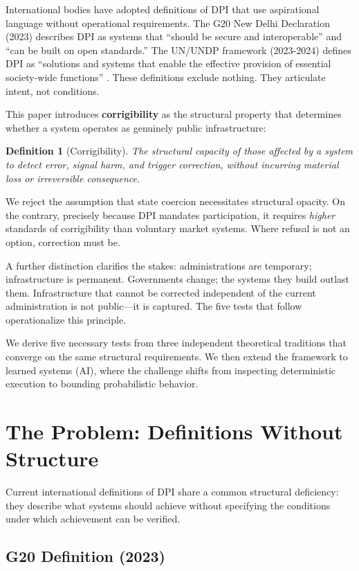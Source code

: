 \documentclass[11pt,a4paper]{article}
\newtheorem{definition}{Definition}
\begin{document}
International bodies have adopted definitions of DPI that use aspirational language without operational requirements. The G20 New Delhi Declaration (2023) describes DPI as systems that ``should be secure and interoperable'' and ``can be built on open standards.'' The UN/UNDP framework (2023-2024) defines DPI as ``solutions and systems that enable the effective provision of essential society-wide functions'' \citep{undp}. These definitions exclude nothing. They articulate intent, not conditions.

This paper introduces \textbf{corrigibility} as the structural property that determines whether a system operates as genuinely public infrastructure:

\begin{definition}[Corrigibility]
The structural capacity of those affected by a system to detect error, signal harm, and trigger correction, without incurring material loss or irreversible consequence.
\end{definition}

We reject the assumption that state coercion necessitates structural opacity. On the contrary, precisely because DPI mandates participation, it requires \textit{higher} standards of corrigibility than voluntary market systems. Where refusal is not an option, correction must be.

A further distinction clarifies the stakes: administrations are temporary; infrastructure is permanent. Governments change; the systems they build outlast them. Infrastructure that cannot be corrected independent of the current administration is not public---it is captured. The five tests that follow operationalize this principle.

We derive five necessary tests from three independent theoretical traditions that converge on the same structural requirements. We then extend the framework to learned systems (AI), where the challenge shifts from inspecting deterministic execution to bounding probabilistic behavior.

\section{The Problem: Definitions Without Structure}

Current international definitions of DPI share a common structural deficiency: they describe what systems should achieve without specifying the conditions under which achievement can be verified.

\subsection{G20 Definition (2023)}
\end{document}
